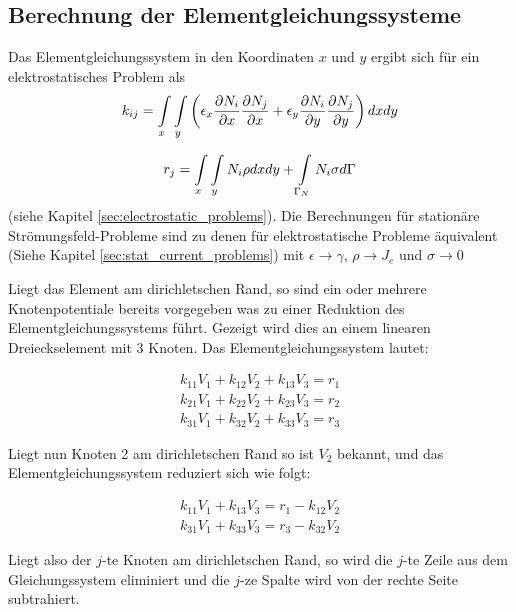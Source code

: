 \subsection{Berechnung der Elementgleichungssysteme}
\label{sec:equation_system_calculation}

Das Elementgleichungssystem in den Koordinaten $x$ und $y$ ergibt sich für ein elektrostatisches Problem als
\begin{equation}
\label{eq:k_ij_e_static_2}
k_{ij} = \int\displaylimits_{x} \int\displaylimits_{y} \left(\epsilon_x \frac{\partial N_i}{\partial x}\frac{\partial N_j}{\partial x} +  \epsilon_y\frac{\partial N_i}{\partial y}\frac{\partial N_j}{\partial y}\right)dx dy
\end{equation}

\begin{equation}
\label{eq:right_side_e_static_2}
r_j = \int\displaylimits_{x} \int\displaylimits_{y} N_i \rho dx dy + \int\displaylimits_{\Gamma_N} N_i\sigma d\Gamma
\end{equation} 
(siehe Kapitel \ref{sec:electrostatic_problems}). Die Berechnungen für stationäre Strömungsfeld-Probleme sind zu denen für elektrostatische Probleme äquivalent (Siehe Kapitel \ref{sec:stat_current_problems}) mit $\epsilon \rightarrow \gamma$, $\rho \rightarrow J_e$ und $\sigma \rightarrow 0$\newline

Liegt das Element am dirichletschen Rand, so sind ein oder mehrere Knotenpotentiale bereits vorgegeben was zu einer Reduktion des Elementgleichungssystems führt. Gezeigt wird dies an einem linearen Dreieckselement mit 3 Knoten. Das Elementgleichungssystem lautet:

\begin{align*}
	k_{11} V_1 + k_{12} V_2 + k_{13} V_3 = r_1\\
	k_{21} V_1 + k_{22} V_2 + k_{23} V_3 = r_2\\
	k_{31} V_1 + k_{32} V_2 + k_{33} V_3 = r_3
\end{align*}

Liegt nun Knoten 2 am dirichletschen Rand so ist $V_2$ bekannt, und das Elementgleichungssystem reduziert sich wie folgt:

 \begin{align*}
 k_{11} V_1  + k_{13} V_3 = r_1 - k_{12} V_2\\
 k_{31} V_1  + k_{33} V_3 = r_3 - k_{32} V_2
 \end{align*}
 
 Liegt also der $j$-te Knoten am dirichletschen Rand, so wird die $j$-te Zeile aus dem Gleichungssystem eliminiert und die $j$-ze Spalte wird von der rechte Seite subtrahiert.


